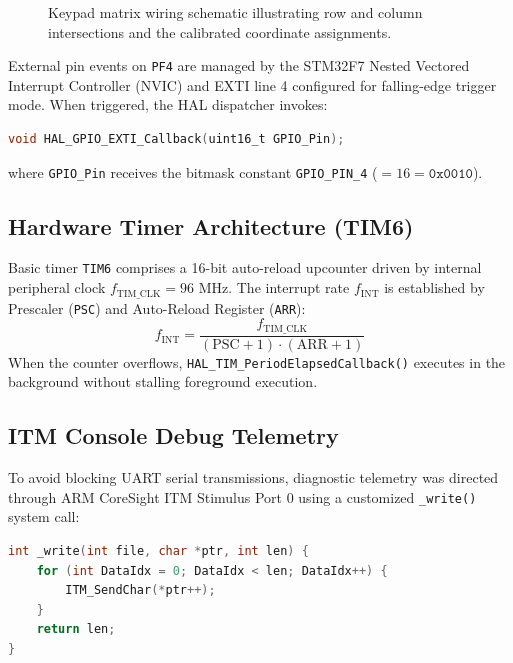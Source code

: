 \begin{figure}[htbp]
    \centering
    \caption{Keypad matrix wiring schematic illustrating row and column intersections and the calibrated coordinate assignments.}
    \label{fig:keypad_matrix_schematic}
\end{figure}

External pin events on \texttt{PF4} are managed by the STM32F7 Nested Vectored Interrupt Controller (NVIC) and EXTI line 4 configured for falling-edge trigger mode. When triggered, the HAL dispatcher invokes:
\begin{lstlisting}[language=C]
void HAL_GPIO_EXTI_Callback(uint16_t GPIO_Pin);
\end{lstlisting}
where \texttt{GPIO\_Pin} receives the bitmask constant \texttt{GPIO\_PIN\_4} ($= 16 = \texttt{0x0010}$).

\subsection{Hardware Timer Architecture (TIM6)}
Basic timer \texttt{TIM6} comprises a 16-bit auto-reload upcounter driven by internal peripheral clock $f_{\text{TIM\_CLK}} = 96\text{ MHz}$. The interrupt rate $f_{\text{INT}}$ is established by Prescaler (\texttt{PSC}) and Auto-Reload Register (\texttt{ARR}):
\begin{equation}
    f_{\text{INT}} = \frac{f_{\text{TIM\_CLK}}}{(\text{PSC} + 1) \cdot (\text{ARR} + 1)}
    \label{eq:timer_calc}
\end{equation}
When the counter overflows, \texttt{HAL\_TIM\_PeriodElapsedCallback()} executes in the background without stalling foreground execution.

\subsection{ITM Console Debug Telemetry}
To avoid blocking UART serial transmissions, diagnostic telemetry was directed through ARM CoreSight ITM Stimulus Port 0 using a customized \texttt{\_write()} system call:
\begin{lstlisting}[language=C, caption={Standard output redirection to ITM Stimulus Port 0.}, label={lst:write_redirect}]
int _write(int file, char *ptr, int len) {
    for (int DataIdx = 0; DataIdx < len; DataIdx++) {
        ITM_SendChar(*ptr++);
    }
    return len;
}
\end{lstlisting}

